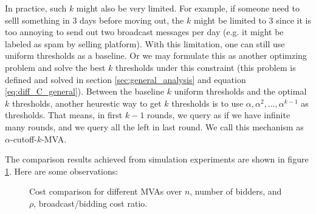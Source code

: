 In practice, such $k$ might also be very limited. For example, if someone need
to selll something in $3$ days before moving out, the $k$ might be limited to
$3$ since it is too annoying to send out two broadcast messages per day (e.g. it
might be labeled as spam by selling platform).  With this limitation, one can
still use uniform thresholds as a baseline. Or we may formulate this as another
optimzing problem and solve the best $k$ thresholds under this constraint (this
problem is defined and solved in section \ref{sec:general_analysis} and
equation \ref{eq:diff_C_general}).  Between the baseline $k$ uniform thresholds
and the optimal $k$ thresholds, another heurestic way to get $k$ thresholds is
to use $\alpha, \alpha^2, \ldots, \alpha^{k-1}$ as thresholds. That means, in
first $k-1$ rounds, we query as if we have infinite many rounds, and we query
all the left in last round. We call this mechanism as $\alpha$-cutoff-$k$-MVA.

The comparison results achieved from simulation experiments are shown in figure
\ref{fig:cost_comparisons}. Here are some observations:

\begin{figure}
\centering
    \caption{Cost comparison for different MVAs over $n$, number of bidders, and $\rho$, broadcast/bidding cost ratio.}
    \label{fig:cost_comparisons}
\end{figure}

